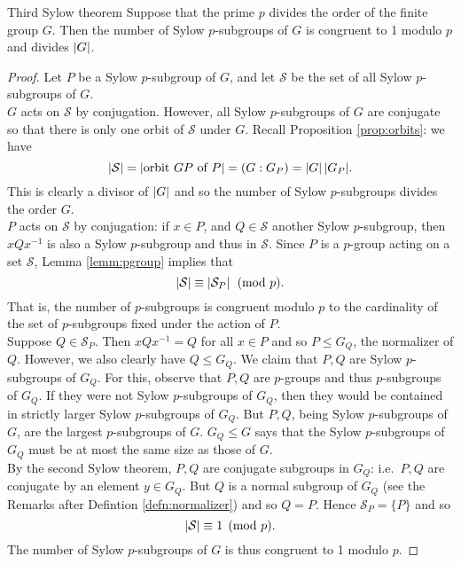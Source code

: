 \begin{thm}{Third Sylow theorem}{}
Suppose that the prime $p$ divides the order of the finite group $G$. Then the number of Sylow $p$-subgroups of $G$ is congruent to 1 modulo $p$ and divides $\left| G\right|$.
\end{thm}

\begin{proof}
\def\SSS{\mathcal{S}}
Let $P$ be a Sylow $p$-subgroup of $G$, and let $\SSS$ be the set of all Sylow $p$-subgroups of $G$.\\
$G$ acts on $\SSS$ by conjugation. However, all Sylow $p$-subgroups of $G$ are conjugate so that there is only one orbit of $\SSS$ under $G$. Recall Proposition \ref{prop:orbits}: we have
\[\nm{\SSS}=\nm{\text{orbit $GP$ of $P$}}=(G:G_P)=\nm{G}{\nm{G_P}}.\]
This is clearly a divisor of $\left| G\right|$ and so the number of Sylow $p$-subgroups divides the order $G$.\\
$P$ acts on $\SSS$ by conjugation: if $x\in P$, and $Q\in\SSS$ another Sylow $p$-subgroup, then $xQx^{-1}$ is also a Sylow $p$-subgroup and thus in $\SSS$. Since $P$ is a $p$-group acting on a set $\SSS$, Lemma \ref{lemm:pgroup} implies that
\[\nm{\SSS}\equiv\nm{\SSS_P}\pmod p.\]
That is, the number of $p$-subgroups is congruent modulo $p$ to the cardinality of the set of $p$-subgroups fixed under the action of $P$.\\
Suppose $Q\in \SSS_P$. Then $xQx^{-1}=Q$ for all $x\in P$ and so $P\le G_Q$, the normalizer of $Q$. However, we also clearly have $Q\le G_Q$. We claim that $P,Q$ are Sylow $p$-subgroups of $G_Q$. For this, observe that $P,Q$ are $p$-groups and thus $p$-subgroups of $G_Q$. If they were not Sylow $p$-subgroups of $G_Q$, then they would be contained in strictly larger Sylow $p$-subgroups of $G_Q$. But $P,Q$, being Sylow $p$-subgroups of $G$, are the largest $p$-subgroups of $G$. $G_Q\le G$ says that the Sylow $p$-subgroups of $G_Q$ must be at most the same size as those of $G$.\\
By the second Sylow theorem, $P,Q$ are conjugate subgroups in $G_Q$: i.e.~$P,Q$ are conjugate by an element $y\in G_Q$. But $Q$ is a normal subgroup of $G_Q$ (see the Remarks after Defintion \ref{defn:normalizer}) and so $Q=P$. Hence $\SSS_P=\{P\}$ and so
\[\nm{\SSS}\equiv 1\pmod p.\]
The number of Sylow $p$-subgroups of $G$ is thus congruent to 1 modulo $p$.
\end{proof}


